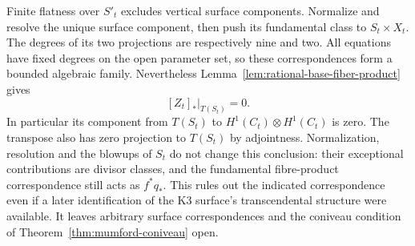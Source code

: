 Finite flatness over $S'_t$ excludes vertical surface components.
Normalize and resolve the unique surface component, then push its
fundamental class to $S_t\times X_t$.  The degrees of its two
projections are respectively nine and two.
All equations have fixed degrees on the open parameter set,
so these correspondences form a bounded algebraic family.
Nevertheless Lemma~\ref{lem:rational-base-fiber-product} gives
\[
 [Z_t]_*|_{T(S_t)}=0.
\]
In particular its component from $T(S_t)$ to
$H^1(C_t)\otimes H^1(C_t)$ is zero.
The transpose also has zero projection to $T(S_t)$ by adjointness.
Normalization, resolution and the blowups of $S_t$ do not change
this conclusion: their exceptional contributions are divisor
classes, and the fundamental fibre-product correspondence still
acts as $f^*q_*$.
This rules out the indicated correspondence even if a later
identification of the K3 surface's transcendental structure were
available.  It leaves arbitrary surface correspondences and the
coniveau condition of Theorem~\ref{thm:mumford-coniveau} open.
